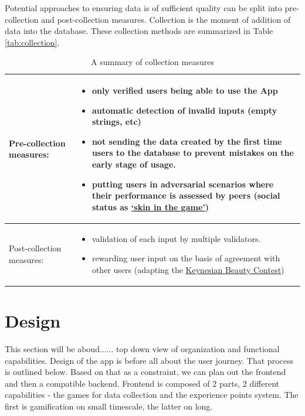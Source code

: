 \documentclass{report}
\begin{document}
Potential approaches to ensuring data is of sufficient quality can be split into pre-collection and post-collection measures. Collection is the moment of addition of data into the database. These collection methods are summarized in Table \ref{tab:collection}.

  \begin{table}[h!]
      \centering
    \begin{tabular}{|l|p{4cm}|}
\toprule
Pre-collection measures:  & \begin{itemize}[left=0pt,topsep=0pt]\item only verified users being able to use the App
  \item automatic detection of invalid inputs (empty strings, etc)
  \item not sending the data created by the first time users to the database to prevent mistakes on the early stage of usage.
  \item putting users in adversarial scenarios where their performance is assessed by peers (social status as \href{https://dictionary.cambridge.org/dictionary/english/have-skin-in-the-game}{`skin in the game'})
\end{itemize} \\
\midrule
       Post-collection measures:  & \begin{itemize}[left=0pt,topsep=0pt]
  \item validation of each input by multiple validators.  
  \item rewarding user input on the basis of agreement with other users (adapting the \href{https://en.wikipedia.org/wiki/Keynesian_beauty_contest}{Keynesian Beauty Contest}\cite{Keynes1936})
\end{itemize} \\
\bottomrule
    \end{tabular}
    \caption{A summary of collection measures}

 \end{table}\label{tab:collection}

\newpage

\chapter{Design}
This section will be aboud...... top down view of organization and functional capabilities.
Design of the app is before all about the user journey. That process is outlined below. Based on that as a constraint, we can plan out the frontend and then a compatible backend.
Frontend is composed of 2 parts, 2 different capabilities - the games for data collection and the experience points system. The first is gamification on small timescale, the latter on long.
\end{document}

